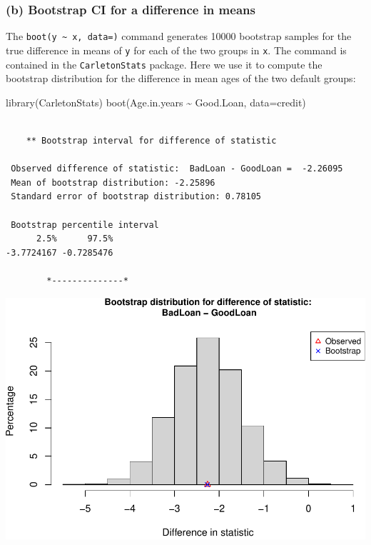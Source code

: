 \documentclass[
]{book}
\newenvironment{Shaded}{\begin{snugshade}}{\end{snugshade}}
\newcommand{\AttributeTok}[1]{\textcolor[rgb]{0.77,0.63,0.00}{#1}}
\newcommand{\FunctionTok}[1]{\textcolor[rgb]{0.00,0.00,0.00}{#1}}
\newcommand{\NormalTok}[1]{#1}
\newcommand{\SpecialCharTok}[1]{\textcolor[rgb]{0.00,0.00,0.00}{#1}}
\begin{document}
\hypertarget{b-bootstrap-ci-for-a-difference-in-means}{%
\subsubsection{(b) Bootstrap CI for a difference in means}\label{b-bootstrap-ci-for-a-difference-in-means}}

The \texttt{boot(y\ \textasciitilde{}\ x,\ data=)} command generates 10000 bootstrap samples for the true difference in means of \texttt{y} for each of the two groups in \texttt{x}. The command is contained in the \texttt{CarletonStats} package. Here we use it to compute the bootstrap distribution for the difference in mean ages of the two default groups:

\begin{Shaded}
\begin{Highlighting}[]
\FunctionTok{library}\NormalTok{(CarletonStats)}
\FunctionTok{boot}\NormalTok{(Age.in.years }\SpecialCharTok{\textasciitilde{}}\NormalTok{ Good.Loan, }\AttributeTok{data=}\NormalTok{credit)}
\end{Highlighting}
\end{Shaded}

\begin{verbatim}

    ** Bootstrap interval for difference of statistic

 Observed difference of statistic:  BadLoan - GoodLoan =  -2.26095 
 Mean of bootstrap distribution: -2.25896 
 Standard error of bootstrap distribution: 0.78105 

 Bootstrap percentile interval
      2.5%      97.5% 
-3.7724167 -0.7285476 

        *--------------*
\end{verbatim}

\includegraphics[width=1\linewidth]{Class_Activity_8_files/figure-latex/unnamed-chunk-5-1}
\end{document}
